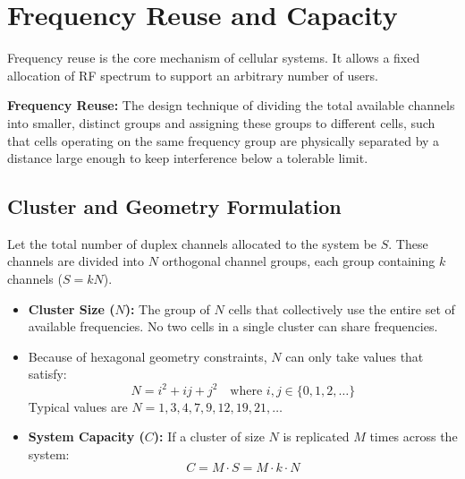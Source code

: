 \documentclass[12pt,a4paper]{article}
\begin{document}
\section{Frequency Reuse and Capacity}

Frequency reuse is the core mechanism of cellular systems. It allows a fixed allocation of RF spectrum to support an arbitrary number of users.

\begin{tcolorbox}[defbox]
\textbf{Frequency Reuse:} The design technique of dividing the total available channels into smaller, distinct groups and assigning these groups to different cells, such that cells operating on the same frequency group are physically separated by a distance large enough to keep interference below a tolerable limit.
\end{tcolorbox}

\subsection{Cluster and Geometry Formulation}
Let the total number of duplex channels allocated to the system be $S$. These channels are divided into $N$ orthogonal channel groups, each group containing $k$ channels ($S = k N$).
\begin{itemize}[leftmargin=*, itemsep=2.5pt]
  \item \textbf{Cluster Size ($N$):} The group of $N$ cells that collectively use the entire set of available frequencies. No two cells in a single cluster can share frequencies.
  \item Because of hexagonal geometry constraints, $N$ can only take values that satisfy:
    \begin{equation}
      N = i^2 + ij + j^2 \quad \text{where } i, j \in \{0, 1, 2, \dots\}
    \end{equation}
    Typical values are $N = 1, 3, 4, 7, 9, 12, 19, 21, \dots$
  \item \textbf{System Capacity ($C$):} If a cluster of size $N$ is replicated $M$ times across the system:
    \begin{equation}
      C = M \cdot S = M \cdot k \cdot N
    \end{equation}
\end{itemize}
\end{document}
